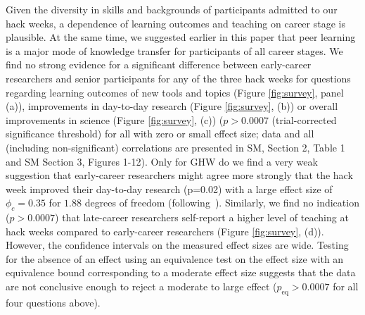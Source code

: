 Given the diversity in skills and backgrounds of participants admitted to our hack weeks, a dependence of learning outcomes and teaching on career stage is plausible. At the same time, we suggested earlier in this paper that peer learning is a major mode of knowledge transfer for participants of all career stages. We find no strong evidence for a significant difference between early-career researchers and senior participants for any of the three hack weeks for questions regarding learning outcomes of new tools and topics (Figure \ref{fig:survey}, panel (a)), improvements in day-to-day research (Figure \ref{fig:survey}, (b)) or overall improvements in science (Figure \ref{fig:survey}, (c)) ($p > 0.0007$ (trial-corrected significance threshold) for all with zero or small effect size; data and all (including non-significant) correlations are presented in SM, Section 2, Table 1 and SM Section 3, Figures 1-12). Only for GHW do we find a very weak suggestion that early-career researchers might agree more strongly that the hack week improved their day-to-day research (p=0.02) with a large effect size of $\phi_c = 0.35$ for $1.88$ degrees of freedom (following~\citep{cohen1988}).
Similarly, we find no indication ($p > 0.0007$) that late-career researchers self-report a higher level of teaching at hack weeks compared to early-career researchers (Figure \ref{fig:survey}, (d)). However, the confidence intervals on the measured effect sizes are wide. Testing for the absence of an effect using an equivalence test on the effect size with an equivalence bound corresponding to a moderate effect size suggests that the data are not conclusive enough to reject a moderate to large effect ($ p_\mathrm{eq} > 0.0007$ for all four questions above). 

